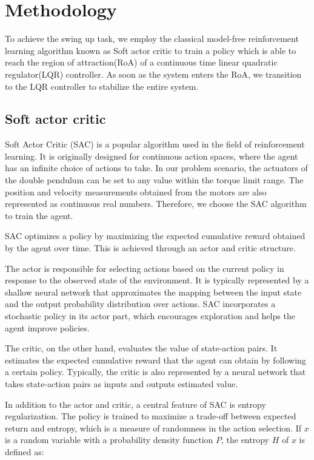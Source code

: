 \chapter{Methodology}
To achieve the swing up task, we employ the classical model-free reinforcement learning algorithm known as Soft actor critic to train a policy which is able to reach the region of attraction(RoA) of a continuous time linear quadratic regulator(LQR) controller. As soon as the system enters the RoA, we transition to the LQR controller to stabilize the entire system.

\section{Soft actor critic}
Soft Actor Critic (SAC) is a popular algorithm
used in the field of reinforcement learning. It is originally
designed for continuous action spaces, where the agent has
an infinite choice of actions to take. In our problem scenario,
the actuators of the double pendulum can be set to any
value within the torque limit range. The position and velocity
measurements obtained from the motors are also represented
as continuous real numbers. Therefore, we choose the SAC algorithm to train the agent.

SAC optimizes a policy by maximizing the expected cumulative reward obtained by
the agent over time. This is achieved through an actor and critic
structure.

The actor is responsible for selecting actions based on the current policy in
response to the observed state of the environment. It is typically represented
by a shallow neural network that approximates the mapping between the input
state and the output probability distribution over actions. SAC incorporates a
stochastic policy in its actor part, which encourages exploration and helps the
agent improve policies.

The critic, on the other hand, evaluates the value of state-action pairs. It
estimates the expected cumulative reward that the agent can obtain by following
a certain policy. Typically, the critic is also represented by a neural
network that takes state-action pairs as inputs and outputs estimated value.

In addition to the actor and critic, a central feature of SAC is entropy
regularization. The policy is trained to maximize a trade-off between expected return and entropy, which is a measure of randomness in the action selection. If
\(x\) is a random variable with a probability density function \(P\), the
entropy \(H\) of \(x\) is defined as:


